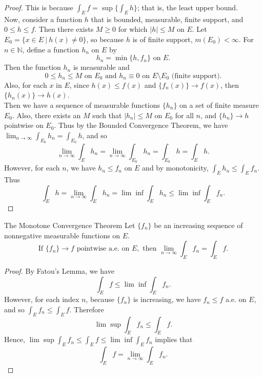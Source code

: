 \begin{flushleft}
\begin{proof}
        This is because $\int_Ef=\sup\biggl\{\int_Eh \biggr\}$; that is, the least upper bound.
        \\Now, consider a function $h$ that is bounded, measurable, finite support, and $0\le h\le f$.
        Then there exists $M\ge0$ for which $|h|\le M$ on $E$.
        Let $E_0=\{x\in E\ |\ h(x)\neq0\}$, so because $h$ is of finite support, $m(E_0)<\infty$.
        For $n\in\mathbb{N}$, define a function $h_n$ on $E$ by
        \[
            h_n=\min\{h,f_n\}\text{ on }E.    
        \]
        Then the function $h_n$ is measurable and
        \[
            0\le h_n\le M\text{ on }E_0\text{ and }h_n\equiv0\text{ on }E\setminus E_0\text{ (finite support)}.
        \]
        Also, for each $x$ in $E$, since $h(x)\le f(x)$ and $\{f_n(x)\}\to f(x)$, then $\{h_n(x)\}\to h(x)$.
        \\Then we have a sequence of measurable functions $\{h_n\}$ on a set of finite measure $E_0$.
        Also, there exists an $M$ such that $|h_n|\le M$ on $E_0$ for all $n$, and $\{h_n\}\to h$ pointwise on $E_0$. 
        Thus by the Bounded Convergence Theorem, we have $\lim_{n\to\infty}\int_{E_0}h_n=\int_{E_0}h$, and so
        \[
            \lim_{n\to\infty}\int_{E}h_n=\lim_{n\to\infty}\int_{E_0}h_n=\int_{E_0}h=\int_Eh.
        \]
        However, for each $n$, we have $h_n\le f_n$ on $E$ and by monotonicity, $\int_Eh_n\le\int_Ef_n$.
        Thus
        \[
            \int_Eh=\lim_{n\to\infty}\int_{E}h_n=\lim\inf\int_{E}h_n\le\lim\inf\int_{E}f_n.    
        \]
    \end{proof}
    \begin{namedthm*}{The Monotone Convergence Theorem}
        Let $\{f_n\}$ be an increasing sequence of nonnegative measurable functions on $E$.
        \[
            \text{If }\{f_n\}\to f\text{ pointwise a.e. on }E,\text{ then }\lim_{n\to\infty}\int_Ef_n=\int_Ef.
        \]
    \end{namedthm*}
    \begin{proof}
        By Fatou's Lemma, we have
        \[
            \int_Ef\le\lim\inf\int_Ef_n.  
        \]
        However, for each index $n$, because $\{f_n\}$ is increasing, we have $f_n\le f$ a.e. on $E$, and so $\int_Ef_n\le\int_Ef$.
        Therefore
        \[
            \lim\sup\int_Ef_n\le\int_Ef.
        \]
        Hence, $\lim\sup\int_Ef_n\le\int_Ef\le\lim\inf\int_Ef_n$ implies that
        \[
            \int_Ef=\lim_{n\to\infty}\int_Ef_n.
        \]
    \end{proof}

\end{flushleft}
